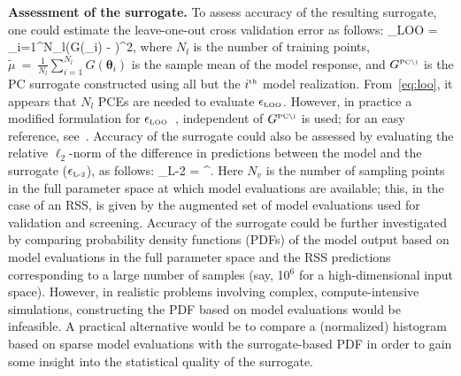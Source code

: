 \textbf{Assessment of the surrogate.}
To assess accuracy of the resulting surrogate, one could estimate the
leave-one-out cross validation error as follows:
\be
\epsilon_{\mbox{\tiny LOO}} = 
{\sum\limits_{i=1}^{N_l}\left(G(\bm{\theta}_i) - \widetilde{\mu}\right)^2},
\label{eq:loo}
\ee
where $N_l$ is the number of training points,
$\widetilde{\mu}~=~\frac{1}{N_l}\sum\limits_{i=1}^{N_l} G(\bm{\theta}_i)$ is
the sample mean of the model response, and $ G^{\mbox{\tiny {PC}\textbackslash
i}}$ is the PC surrogate constructed using all but the $i^{\mbox{\tiny{th}}}$
model realization.  From~\eqref{eq:loo}, it appears that $N_l$ PCEs are needed
to evaluate $\epsilon_{\mbox{\tiny LOO}}$.  However, in practice a modified
formulation for $\epsilon_{\mbox{\tiny LOO}}$~\cite{Blatman:2009}, independent
of $G^{\mbox{\tiny {PC}\textbackslash i}}$ is used; for an easy reference,
see~\cite[Eq.~(1.27)]{Marelli:2014}.  Accuracy of the surrogate could also 
be assessed by evaluating the relative $\ell_2$-norm of the difference in
predictions between the model and the surrogate ($\epsilon_{\mbox{\tiny{L-2}}}$), as follows:
\be
\epsilon_{\mbox{\tiny{L-2}}} = 
{\left[\sum\limits_{i=1}^{N_v}\left(G(\bm{\theta}_i)\right)^2\right]^{}}.
\label{eq:l2}
\ee
Here $N_v$ is the number of sampling points in the full parameter space at
which model evaluations are available; this, in the case of an RSS, is 
given by the
augmented set of model evaluations used for validation and screening.  
%
Accuracy of the surrogate could be further investigated by comparing
probability density functions (PDFs) of the model output based on model
evaluations in the full parameter space and the RSS predictions corresponding
to a large number of samples (say, 10$^6$ for a high-dimensional input space).
However, in realistic problems
involving complex, compute-intensive simulations, constructing the PDF based on model
evaluations would be infeasible.  A practical alternative would be to compare
a (normalized) histogram based on sparse model evaluations with the surrogate-based PDF in
order to gain some insight into the statistical quality of the surrogate. 


